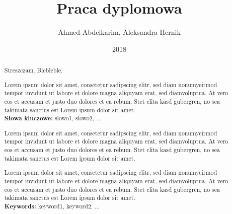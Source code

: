 \documentclass[pl]{minipw} %
\title{Praca dyplomowa} %
\author{Ahmed Abdelkarim, Aleksandra Hernik}
\date{2018}
\begin{document}
\sloppy






\begin{abstract}
\setcounter{page}{1}

Streszczam. Blebleble.

Lorem ipsum dolor sit amet, consetetur sadipscing elitr, sed diam nonumyeirmod tempor invidunt ut labore et dolore magna aliquyam erat, sed diamvoluptua. At vero eos et accusam et justo duo dolores et ea rebum. Stet clita kasd gubergren, no sea takimata sanctus est Lorem ipsum dolor sit amet.\\

\noindent \textbf{Słowa kluczowe:} slowo1, slowo2, ...
\end{abstract}


{
\begin{abstract}

Lorem ipsum dolor sit amet, consetetur sadipscing elitr, sed diam nonumyeirmod tempor invidunt ut labore et dolore magna aliquyam erat, sed diamvoluptua. At vero eos et accusam et justo duo dolores et ea rebum. Stet clita kasd gubergren, no sea takimata sanctus est Lorem ipsum dolor sit amet.

Lorem ipsum dolor sit amet, consetetur sadipscing elitr, sed diam nonumyeirmod tempor invidunt ut labore et dolore magna aliquyam erat, sed diamvoluptua. At vero eos et accusam et justo duo dolores et ea rebum. Stet clita kasd gubergren, no sea takimata sanctus est Lorem ipsum dolor sit amet.\\

\noindent \textbf{Keywords:} keyword1, keyword2, ...
\end{abstract}}

\makestatement


\cleardoublepage
\tableofcontents


\cleardoublepage
\pagestyle{fancy}
\end{document}

